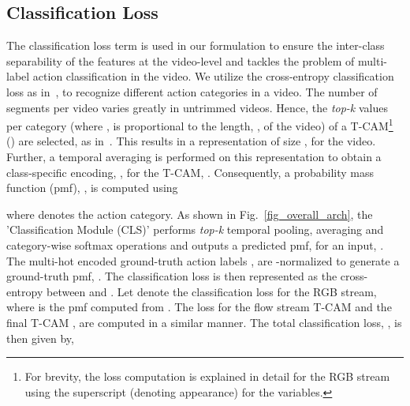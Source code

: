 \documentclass[10pt,twocolumn,letterpaper]{article}
\begin{document}
\subsection{Classification Loss\label{sec_mill}}
The classification loss term is used in our formulation to ensure the inter-class separability of the features at the video-level and tackles the problem of multi-label action classification in the video. We utilize the cross-entropy classification loss as in~\cite{untrimnets,wtalc}, to recognize different action categories in a video. The number of segments per video varies greatly in untrimmed videos. Hence, the \emph{top-k} values per category (where , is proportional to the length, , of the video) of a T-CAM\footnote{\label{footnote_loss_for_single_stream}For brevity, the loss computation is explained in detail for the RGB stream using the superscript  (denoting appearance) for the variables.} () are selected, as in~\cite{wtalc}. This results in a representation of size , for the video. Further, a temporal averaging is performed on this representation to obtain a class-specific encoding, , for the T-CAM, . Consequently, a probability mass function (pmf), , is computed using
\vspace{-0.1cm}

where  denotes the action category. As shown in Fig.~\ref{fig_overall_arch}, the 'Classification Module (CLS)' performs \emph{top-k} temporal pooling, averaging and category-wise softmax operations and outputs a predicted pmf,  for an input, . The multi-hot encoded ground-truth action labels , are -normalized to generate a ground-truth pmf, . The classification loss is then represented as the cross-entropy between  and . Let  denote the classification loss for the RGB stream, where  is the pmf computed from . 
The loss for the flow stream T-CAM  and the final T-CAM , are computed in a similar manner. The total classification loss, , is then given by,

\vspace{-0.1cm}
\end{document}
